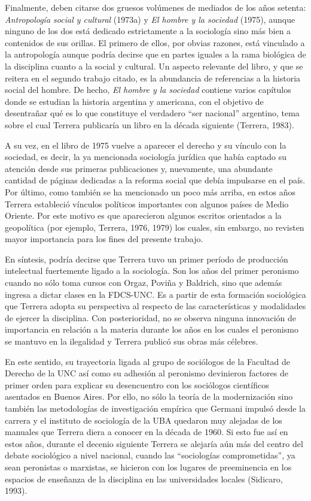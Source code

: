 Finalmente, deben citarse dos gruesos volúmenes de mediados de los años setenta: \emph{Antropología social y cultural} (1973a) y \emph{El hombre y la sociedad} (1975), aunque ninguno de los dos está dedicado estrictamente a la sociología sino más bien a contenidos de sus orillas. El primero de ellos, por obvias razones, está vinculado a la antropología aunque podría decirse que en partes iguales a la rama biológica de la disciplina cuanto a la social y cultural. Un aspecto relevante del libro, y que se reitera en el segundo trabajo citado, es la abundancia de referencias a la historia social del hombre. De hecho, \emph{El hombre y la sociedad} contiene varios capítulos donde se estudian la historia argentina y americana, con el objetivo de desentrañar qué es lo que constituye el verdadero ``ser nacional'' argentino, tema sobre el cual Terrera publicaría un libro en la década siguiente (Terrera, 1983).

A su vez, en el libro de 1975 vuelve a aparecer el derecho y su vínculo con la sociedad, es decir, la ya mencionada sociología jurídica que había captado su atención desde sus primeras publicaciones y, nuevamente, una abundante cantidad de páginas dedicadas a la reforma social que debía impulsarse en el país. Por último, como también se ha mencionado un poco más arriba, en estos años Terrera estableció vínculos políticos importantes con algunos países de Medio Oriente. Por este motivo es que aparecieron algunos escritos orientados a la geopolítica (por ejemplo, Terrera, 1976, 1979) los cuales, sin embargo, no revisten mayor importancia para los fines del presente trabajo.

En síntesis, podría decirse que Terrera tuvo un primer período de producción intelectual fuertemente ligado a la sociología. Son los años del primer peronismo cuando no sólo toma cursos con Orgaz, Poviña y Baldrich, sino que además ingresa a dictar clases en la FDCS-UNC. Es a partir de esta formación sociológica que Terrera adopta su perspectiva al respecto de las características y modalidades de ejercer la disciplina. Con posterioridad, no se observa ninguna innovación de importancia en relación a la materia durante los años en los cuales el peronismo se mantuvo en la ilegalidad y Terrera publicó sus obras más célebres.

En este sentido, su trayectoria ligada al grupo de sociólogos de la Facultad de Derecho de la UNC así como su adhesión al peronismo devinieron factores de primer orden para explicar su desencuentro con los sociólogos científicos asentados en Buenos Aires. Por ello, no sólo la teoría de la modernización sino también las metodologías de investigación empírica que Germani impulsó desde la carrera y el instituto de sociología de la UBA quedaron muy alejadas de los manuales que Terrera diera a conocer en la década de 1960. Si esto fue así en estos años, durante el decenio siguiente Terrera se alejaría aún más del centro del debate sociológico a nivel nacional, cuando las ``sociologías comprometidas'', ya sean peronistas o marxistas, se hicieron con los lugares de preeminencia en los espacios de enseñanza de la disciplina en las universidades locales (Sidicaro, 1993).

